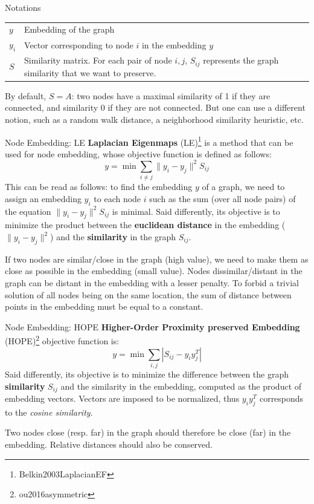\documentclass[a4paper,11pt]{book}
\begin{document}
\begin{textbox}{Notations}
\begin{tabular}{p{}|p{}}\scriptsize
$y$ & Embedding of the graph \\
$y_i$ & Vector corresponding to node $i$ in the embedding $y$\\
$S$ & Similarity matrix. For each pair of node $i,j$, $S_{ij}$ represents the graph similarity that we want to preserve. 
\end{tabular}
By default, $S=A$: two nodes have a maximal similarity of 1 if they are connected, and similarity 0 if they are not connected. But one can use a different notion, such as a random walk distance, a neighborhood similarity heuristic, etc. 
\end{textbox}


\begin{textbox}{Node Embedding: LE}
\textbf{Laplacian Eigenmaps} (LE)\footnote{Belkin2003LaplacianEF} is a method that can be used for node embedding, whose objective function is defined as follows:
\[
y=\min \sum_{i\neq j}\lVert y_i - y_j \rVert ^2 S_{ij}
\]
This can be read as follows: to find the embedding $y$ of a graph, we need to assign an embedding $y_i$ to each node $i$ such as the sum (over all node pairs) of the equation $\lVert y_i - y_j \rVert ^2 S_{ij}$ is minimal.
Said differently, its objective is to minimize the product between the \textbf{euclidean distance} in the embedding ($\lVert y_i - y_j \rVert ^2$) and the \textbf{similarity} in the graph $S_{ij}$.

If two nodes are similar/close in the graph (high value), we need to make them as close as possible in the embedding (small value). Nodes dissimilar/distant in the graph can be distant in the embedding with a lesser penalty. To forbid a trivial solution of all nodes being on the same location, the sum of distance between points in the embedding must be equal to a constant.
\end{textbox}



\begin{textbox}{Node Embedding: HOPE}
\textbf{Higher-Order Proximity preserved Embedding}  (HOPE)\footnote{ou2016asymmetric} objective function is:
\[
y=\min \sum_{i,j} |S_{ij}-y_i y_j^T |
\]
Said differently, its objective is to minimize the difference between the graph \textbf{similarity} $S_{ij}$ and the similarity in the embedding, computed as the product of embedding vectors. Vectors are imposed to be normalized, thus $y_i y_j^T$ corresponds to the \textit{cosine similarity}.

Two nodes close (resp. far) in the graph should therefore be close (far) in the embedding. Relative distances should also be conserved.
\end{textbox}
\end{document}
